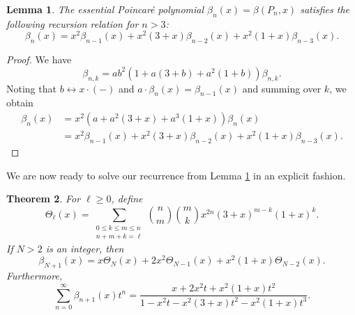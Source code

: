 \documentclass[12pt]{amsart}
\newtheorem{theorem}{Theorem}[section]
\newtheorem{lem}[theorem]{Lemma}
\theoremstyle{definition}
\begin{document}
\begin{lem}\label{PoinRec}
    The essential Poincar\'e polynomial $\beta_n(x)=\beta(P_n,x)$ satisfies the following recursion relation for $n>3$:
        \begin{equation}\label{eq:38}
            \beta_{n}(x) = x^2\beta_{n-1}(x) + x^2(3+x) \beta_{n-2}(x) + x^2(1+x)\beta_{n-3}(x).
        \end{equation}
\end{lem}
\begin{proof}
    We have 
    \[
    \beta_{n,k} = ab^2(1+a(3+b) + a^2(1+b))\beta_{n,k}.
    \]
    Noting that $b \leftrightarrow x\cdot (-)$ and $a\cdot \beta_n(x)=\beta_{n-1}(x)$ and summing over $k$, we obtain 
    \begin{align*}
    \beta_n(x) & =  x^2(a+a^2(3+x) +a^3(1+x)) \beta_n(x)\\
    & = x^2\beta_{n-1}(x) + x^2(3+x) \beta_{n-2}(x) + x^2(1+x)\beta_{n-3}(x).
    \end{align*}
\end{proof}

We are now ready to solve our recurrence from Lemma \ref{PoinRec} in an explicit fashion.

\begin{theorem}\label{PoinFormula}
    For $\ell \geq 0$, define \begin{equation}\label{ThetaPoly} \Theta_\ell(x) =\sum_{\substack{0\leq k\leq m\leq n \\ n+m+k = \ell}} \binom{n}{m} \binom{m}{k}x^{2n}(3+x)^{m-k} (1+x)^k. \end{equation} If $N >2$ is an integer, then 
    \begin{equation}\label{eq:essentialexplicit}
        \beta_{N+1}(x) = x\Theta_N(x) + 2x^2 \Theta_{N-1}(x) + x^2(1+x)\Theta_{N-2}(x).   
    \end{equation}
    Furthermore,
    \begin{equation}\label{eq:43}
\sum_{n=0}^\infty \beta_{n+1}(x)t^n = \frac{x+2x^2t+x^2(1+x)t^2}{1-x^2t-x^2(3+x)t^2-x^2(1+x)t^3}.
    \end{equation}
\end{theorem}
\end{document}
